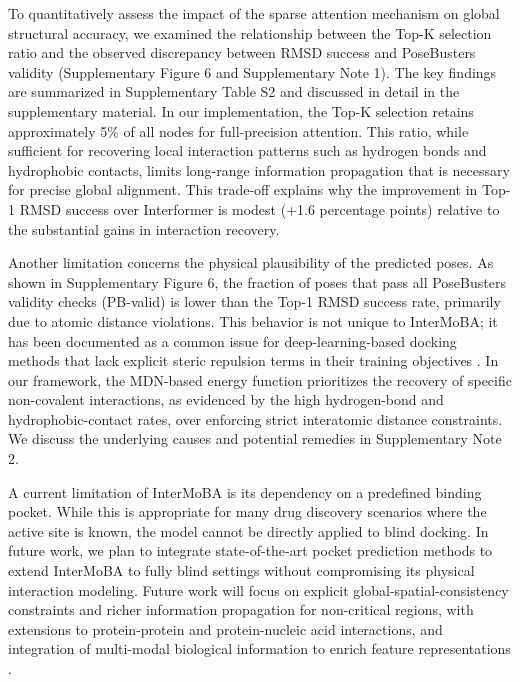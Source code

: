 \documentclass[11pt,a4paper]{article}
\theoremstyle{plain}
\theoremstyle{definition}
\begin{document}
To quantitatively assess the impact of the sparse attention mechanism on global structural accuracy, we examined the relationship between the Top-K selection ratio and the observed discrepancy between RMSD success and PoseBusters validity (Supplementary Figure 6 and Supplementary Note 1). The key findings are summarized in Supplementary Table S2 and discussed in detail in the supplementary material. In our implementation, the Top-K selection retains approximately 5\% of all nodes for full-precision attention. This ratio, while sufficient for recovering local interaction patterns such as hydrogen bonds and hydrophobic contacts, limits long-range information propagation that is necessary for precise global alignment. This trade-off explains why the improvement in Top-1 RMSD success over Interformer is modest (+1.6 percentage points) relative to the substantial gains in interaction recovery.

Another limitation concerns the physical plausibility of the predicted poses. As shown in Supplementary Figure 6, the fraction of poses that pass all PoseBusters validity checks (PB-valid) is lower than the Top-1 RMSD success rate, primarily due to atomic distance violations. This behavior is not unique to InterMoBA; it has been documented as a common issue for deep-learning-based docking methods that lack explicit steric repulsion terms in their training objectives \cite{buttenschoen2024posebusters}. In our framework, the MDN-based energy function prioritizes the recovery of specific non-covalent interactions, as evidenced by the high hydrogen-bond and hydrophobic-contact rates, over enforcing strict interatomic distance constraints. We discuss the underlying causes and potential remedies in Supplementary Note 2.

A current limitation of InterMoBA is its dependency on a predefined binding pocket. While this is appropriate for many drug discovery scenarios where the active site is known, the model cannot be directly applied to blind docking. In future work, we plan to integrate state-of-the-art pocket prediction methods to extend InterMoBA to fully blind settings without compromising its physical interaction modeling. Future work will focus on explicit global-spatial-consistency constraints and richer information propagation for non-critical regions, with extensions to protein-protein and protein-nucleic acid interactions, and integration of multi-modal biological information to enrich feature representations \cite{wu2024leveraging}.

\end{document}
